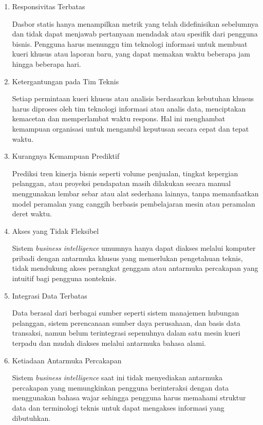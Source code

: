 \begin{enumerate}

\item Responsivitas Terbatas

Dasbor statis hanya menampilkan metrik yang telah didefinisikan sebelumnya dan tidak dapat menjawab pertanyaan mendadak atau spesifik dari pengguna bisnis. Pengguna harus menunggu tim teknologi informasi untuk membuat kueri khusus atau laporan baru, yang dapat memakan waktu beberapa jam hingga beberapa hari.

\item Ketergantungan pada Tim Teknis

Setiap permintaan kueri khusus atau analisis berdasarkan kebutuhan khusus harus diproses oleh tim teknologi informasi atau analis data, menciptakan kemacetan dan memperlambat waktu respons. Hal ini menghambat kemampuan organisasi untuk mengambil keputusan secara cepat dan tepat waktu.

\item Kurangnya Kemampuan Prediktif

Prediksi tren kinerja bisnis seperti volume penjualan, tingkat kepergian pelanggan, atau proyeksi pendapatan masih dilakukan secara manual menggunakan lembar sebar atau alat sederhana lainnya, tanpa memanfaatkan model peramalan yang canggih berbasis pembelajaran mesin atau peramalan deret waktu.

\item Akses yang Tidak Fleksibel

Sistem \textit{business intelligence} umumnya hanya dapat diakses melalui komputer pribadi dengan antarmuka khusus yang memerlukan pengetahuan teknis, tidak mendukung akses perangkat genggam atau antarmuka percakapan yang intuitif bagi pengguna nonteknis.

\item Integrasi Data Terbatas

Data berasal dari berbagai sumber seperti sistem manajemen hubungan pelanggan, sistem perencanaan sumber daya perusahaan, dan basis data transaksi, namun belum terintegrasi sepenuhnya dalam satu mesin kueri terpadu dan mudah diakses melalui antarmuka bahasa alami.

\item Ketiadaan Antarmuka Percakapan

Sistem \textit{business intelligence} saat ini tidak menyediakan antarmuka percakapan yang memungkinkan pengguna berinteraksi dengan data menggunakan bahasa wajar sehingga pengguna harus memahami struktur data dan terminologi teknis untuk dapat mengakses informasi yang dibutuhkan.

\end{enumerate}

